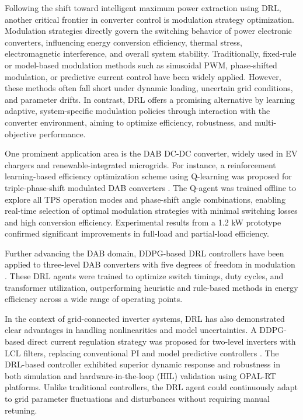 Following the shift toward intelligent maximum power extraction using DRL, another critical frontier in converter control is modulation strategy optimization. Modulation strategies directly govern the switching behavior of power electronic converters, influencing energy conversion efficiency, thermal stress, electromagnetic interference, and overall system stability. Traditionally, fixed-rule or model-based modulation methods such as sinusoidal PWM, phase-shifted modulation, or predictive current control have been widely applied. However, these methods often fall short under dynamic loading, uncertain grid conditions, and parameter drifts. In contrast, DRL offers a promising alternative by learning adaptive, system-specific modulation policies through interaction with the converter environment, aiming to optimize efficiency, robustness, and multi-objective performance.

One prominent application area is the DAB DC-DC converter, widely used in EV chargers and renewable-integrated microgrids. For instance, a reinforcement learning-based efficiency optimization scheme using Q-learning was proposed for triple-phase-shift modulated DAB converters \cite{tang2020reinforcement}. The Q-agent was trained offline to explore all TPS operation modes and phase-shift angle combinations, enabling real-time selection of optimal modulation strategies with minimal switching losses and high conversion efficiency. Experimental results from a 1.2 kW prototype confirmed significant improvements in full-load and partial-load efficiency.

Further advancing the DAB domain, DDPG-based DRL controllers have been applied to three-level DAB converters with five degrees of freedom in modulation \cite{feng2024artificial}. These DRL agents were trained to optimize switch timings, duty cycles, and transformer utilization, outperforming heuristic and rule-based methods in energy efficiency across a wide range of operating points.

In the context of grid-connected inverter systems, DRL has also demonstrated clear advantages in handling nonlinearities and model uncertainties. A DDPG-based direct current regulation strategy was proposed for two-level inverters with LCL filters, replacing conventional PI and model predictive controllers \cite{rajamallaiah2024direct}. The DRL-based controller exhibited superior dynamic response and robustness in both simulation and hardware-in-the-loop (HIL) validation using OPAL-RT platforms. Unlike traditional controllers, the DRL agent could continuously adapt to grid parameter fluctuations and disturbances without requiring manual retuning.

